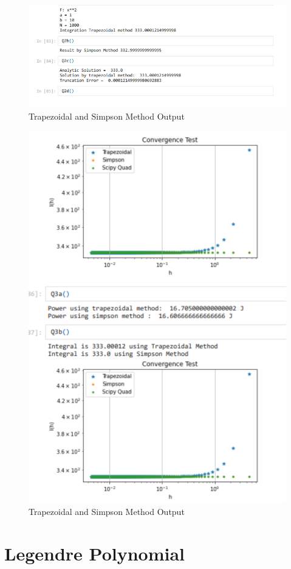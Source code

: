 \documentclass{article}
\begin{document}
\newpage
\begin{figure}[h]
    \centering
    \includegraphics[width=15cm,height=5cm \textwidth]{Trapezoidal_and_simpson/2.PNG}
\caption{Trapezoidal and Simpson Method Output}
\end{figure}
\begin{figure}[h]
    \centering
    \includegraphics[width=15cm,height=12cm \textwidth]{Trapezoidal_and_simpson/Capture.PNG}
\caption{Trapezoidal and Simpson Method Output}
\end{figure}

\clearpage
\section{Legendre Polynomial}

\end{document}
